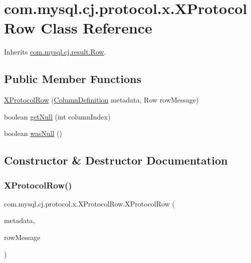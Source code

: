 \hypertarget{classcom_1_1mysql_1_1cj_1_1protocol_1_1x_1_1_x_protocol_row}{}\section{com.\+mysql.\+cj.\+protocol.\+x.\+X\+Protocol\+Row Class Reference}
\label{classcom_1_1mysql_1_1cj_1_1protocol_1_1x_1_1_x_protocol_row}


Inherits \mbox{\hyperlink{interfacecom_1_1mysql_1_1cj_1_1result_1_1_row}{com.\+mysql.\+cj.\+result.\+Row}}.

\subsection*{Public Member Functions}
\begin{DoxyCompactItemize}
\item 
\mbox{\hyperlink{classcom_1_1mysql_1_1cj_1_1protocol_1_1x_1_1_x_protocol_row_aa76bb965d7fa7029ee045625aa64db58}{X\+Protocol\+Row}} (\mbox{\hyperlink{interfacecom_1_1mysql_1_1cj_1_1protocol_1_1_column_definition}{Column\+Definition}} metadata, Row row\+Message)
\item 
boolean \mbox{\hyperlink{classcom_1_1mysql_1_1cj_1_1protocol_1_1x_1_1_x_protocol_row_adeaa06e6fee80085ce70902ed77ce16a}{get\+Null}} (int column\+Index)
\item 
boolean \mbox{\hyperlink{classcom_1_1mysql_1_1cj_1_1protocol_1_1x_1_1_x_protocol_row_ae6fd328d9a5ac92bdbb910fb9c8c043a}{was\+Null}} ()
\end{DoxyCompactItemize}


\subsection{Constructor \& Destructor Documentation}
\mbox{\label{classcom_1_1mysql_1_1cj_1_1protocol_1_1x_1_1_x_protocol_row_aa76bb965d7fa7029ee045625aa64db58}} 
\subsubsection{\texorpdfstring{X\+Protocol\+Row()}{XProtocolRow()}}
{\footnotesize\ttfamily com.\+mysql.\+cj.\+protocol.\+x.\+X\+Protocol\+Row.\+X\+Protocol\+Row (\begin{DoxyParamCaption}\item[{\mbox{\hyperlink{interfacecom_1_1mysql_1_1cj_1_1protocol_1_1_column_definition}{Column\+Definition}}}]{metadata,  }\item[{Row}]{row\+Message }\end{DoxyParamCaption})}



